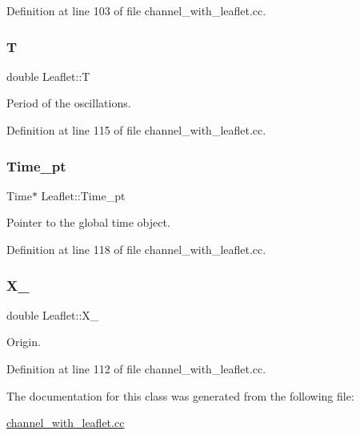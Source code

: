 Definition at line 103 of file channel\+\_\+with\+\_\+leaflet.\+cc.

\mbox{\label{classLeaflet_a0d78b5fb3ec71009d4a9bcc79f8a85a9}} 
\subsubsection{\texorpdfstring{T}{T}}
{\footnotesize\ttfamily double Leaflet\+::T\hspace{0.3cm}{\ttfamily [private]}}



Period of the oscillations. 



Definition at line 115 of file channel\+\_\+with\+\_\+leaflet.\+cc.

\mbox{\label{classLeaflet_ac10f13ad45456dc714ab57042861de53}} 
\subsubsection{\texorpdfstring{Time\+\_\+pt}{Time\_pt}}
{\footnotesize\ttfamily Time$\ast$ Leaflet\+::\+Time\+\_\+pt\hspace{0.3cm}{\ttfamily [private]}}



Pointer to the global time object. 



Definition at line 118 of file channel\+\_\+with\+\_\+leaflet.\+cc.

\mbox{\label{classLeaflet_a29a25366a0cf97ad0dd36172fdfa3d0c}} 
\subsubsection{\texorpdfstring{X\+\_}{X\_0}}
{\footnotesize\ttfamily double Leaflet\+::\+X\+\_\hspace{0.3cm}{\ttfamily [private]}}



Origin. 



Definition at line 112 of file channel\+\_\+with\+\_\+leaflet.\+cc.



The documentation for this class was generated from the following file\+:\begin{DoxyCompactItemize}
\item 
\hyperlink{channel__with__leaflet_8cc}{channel\+\_\+with\+\_\+leaflet.\+cc}\end{DoxyCompactItemize}
